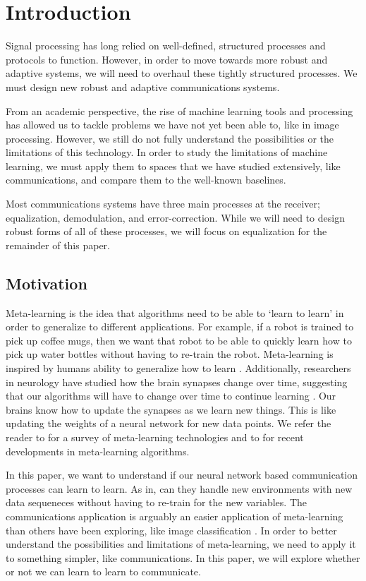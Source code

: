 \chapter{Introduction}

Signal processing has long relied on well-defined, structured processes and protocols to function.  
However, in order to move towards more robust and adaptive systems, we will need to overhaul these tightly structured processes.  We must design new robust and adaptive communications systems.

From an academic perspective, the rise of machine learning tools and processing has allowed us to tackle problems we have not yet been able to, like in image processing.  However, we still do not fully understand the possibilities or the limitations of this technology.  In order to study the limitations of machine learning, we must apply them to spaces that we have studied extensively, like communications, and compare them to the well-known baselines.

Most communications systems have three main processes at the receiver; equalization, demodulation, and error-correction.  While we will need to design robust forms of all of these processes, we will focus on equalization for the remainder of this paper. 

\section{Motivation}

Meta-learning is the idea that algorithms need to be able to `learn to learn' in order to generalize to different applications.  For example, if a robot is trained to pick up coffee mugs, then we want that robot to be able to quickly learn how to pick up water bottles without having to re-train the robot.  
Meta-learning is inspired by humans ability to generalize how to learn \cite{lake}.  
Additionally, researchers in neurology have studied how the brain synapses change over time, suggesting that our algorithms will have to change over time to continue learning \cite{bengio}.
Our brains know how to update the synapses as we learn new things. This is like updating the weights of a neural network for new data points.  
We refer the reader to \cite{lemke} for a survey of meta-learning technologies and to \cite{finn} for recent developments in meta-learning algorithms.

In this paper, we want to understand if our neural network based communication processes can learn to learn.  
As in, can they handle new environments with new data sequeneces without having to re-train for the new variables. 
The communications application is arguably an easier application of meta-learning than others have been exploring, like image classification \cite{khodadadeh}.  
In order to better understand the possibilities and limitations of meta-learning, we need to apply it to something simpler, like communications.  In this paper, we will explore whether or not we can learn to learn to communicate. 

